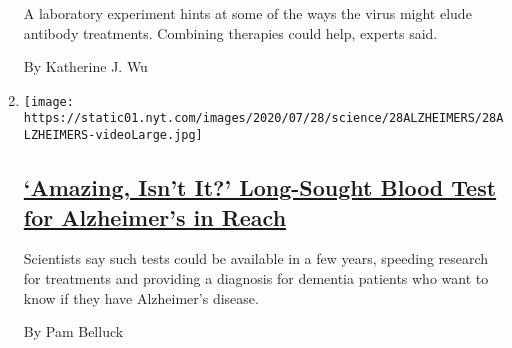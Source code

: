 \begin{enumerate}
  A laboratory experiment hints at some of the ways the virus might
  elude antibody treatments. Combining therapies could help, experts
  said.

  By Katherine J. Wu
\item
  \texttt{[image: https://static01.nyt.com/images/2020/07/28/science/28ALZHEIMERS/28ALZHEIMERS-videoLarge.jpg]}

  \hypertarget{amazing-isnt-it-long-sought-blood-test-for-alzheimers-in-reach}{%
  \subsection{\texorpdfstring{\href{/2020/07/28/health/alzheimers-blood-test.html}{`Amazing,
  Isn't It?' Long-Sought Blood Test for Alzheimer's in
  Reach}}{`Amazing, Isn't It?' Long-Sought Blood Test for Alzheimer's in Reach}}\label{amazing-isnt-it-long-sought-blood-test-for-alzheimers-in-reach}}

  Scientists say such tests could be available in a few years, speeding
  research for treatments and providing a diagnosis for dementia
  patients who want to know if they have Alzheimer's disease.

  By Pam Belluck
\end{enumerate}

